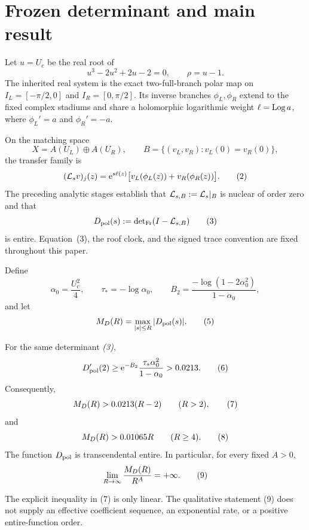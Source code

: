 \section{Frozen determinant and main result}

Let \(u=U_c\) be the real root of
\[
 u^3-2u^2+2u-2=0,
 \qquad \rho=u-1.
 \tag{1}
\]
The inherited real system is the exact two-full-branch polar map on
\(I_L=[-\pi/2,0]\) and \(I_R=[0,\pi/2]\).  Its inverse branches
\(\phi_L,\phi_R\) extend to the fixed complex stadiums and share a
holomorphic logarithmic weight \(\ell=\operatorname{Log} a\), where
\(\phi_L'=a\) and \(\phi_R'=-a\).

On the matching space
\[
 X=A(U_L)\oplus A(U_R),
 \qquad
 B=\{(v_L,v_R):v_L(0)=v_R(0)\},
\]
the transfer family is
\[
 (\mathcal L_s v)_j(z)=\mathrm e^{s\ell(z)}
 \bigl[v_L(\phi_L(z))+v_R(\phi_R(z))\bigr].
 \tag{2}
\]
The preceding analytic stages establish that \(\mathcal L_{s,B}:=\mathcal L_s|_B\) is
nuclear of order zero and that
\[
 D_{\mathrm{pol}}(s):=\operatorname{det}_{\mathrm{Fr}}(I-\mathcal L_{s,B})
 \tag{3}
\]
is entire.  Equation~(3), the roof clock, and the signed trace convention are
fixed throughout this paper.

Define
\[
 \alpha_0=\frac{U_c^2}{4},\qquad
 \tau_*=-\log\alpha_0,
 \qquad
 B_2=\frac{-\log(1-2\alpha_0^2)}{1-\alpha_0},
 \tag{4}
\]
and let
\[
 M_D(R)=\max_{|s|\le R}|D_{\mathrm{pol}}(s)|.
 \tag{5}
\]

\begin{theorem}
For the same determinant \emph{(3)},
\[
 D_{\mathrm{pol}}'(2)\ge
 \mathrm e^{-B_2}\frac{\tau_*\alpha_0^2}{1-\alpha_0}
 >0.0213.
 \tag{6}
\]
Consequently,
\[
 M_D(R)>0.0213(R-2)\qquad(R>2),
 \tag{7}
\]
and
\[
 M_D(R)>0.01065R\qquad(R\ge4).
 \tag{8}
\]
The function \(D_{\mathrm{pol}}\) is transcendental entire.  In particular, for every
fixed \(A>0\),
\[
 \lim_{R\to\infty}\frac{M_D(R)}{R^A}=+\infty.
 \tag{9}
\]
\end{theorem}

The explicit inequality in (7) is only linear.  The qualitative statement
(9) does not supply an effective coefficient sequence, an exponential rate,
or a positive entire-function order.
